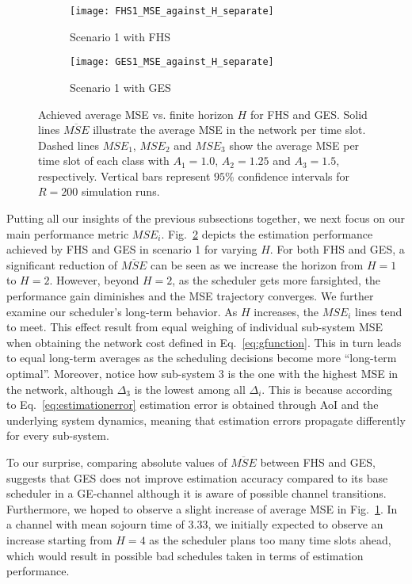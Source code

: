 \begin{figure}[htb]
  \centering
  \begin{subfigure}{0.49\textwidth}
    \centering
    \texttt{[image: FHS1\_MSE\_against\_H\_separate]}
    \caption{Scenario 1 with FHS}
    \label{fig:surprise}
  \end{subfigure}
  \hfill
  \begin{subfigure}{0.5\textwidth}
    \centering
    \texttt{[image: GES1\_MSE\_against\_H\_separate]}
    \caption{Scenario 1 with GES}
  \end{subfigure}
  \caption[Scenario 1: Average MSE vs. finite horizon $H$]{Achieved average
  MSE vs. finite horizon $H$ for FHS and GES. Solid lines $\overline{MSE}$
  illustrate the average MSE in the network per time slot. Dashed lines
  $MSE_1$, $MSE_2$ and $MSE_3$ show the average MSE per time slot of each
  class with $A_1=1.0$, $A_2=1.25$ and $A_3=1.5$, respectively. Vertical bars
  represent $95\%$ confidence intervals for $R=200$ simulation runs.}
  \label{fig:MSEavg}
\end{figure}

Putting all our insights of the previous subsections together, we next focus on
our main performance metric $MSE_i$. Fig.~\ref{fig:MSEavg} depicts the
estimation performance achieved by FHS and GES in scenario 1 for varying $H$.
For both FHS and GES, a significant reduction of $\overline{MSE}$ can be seen as
we increase the horizon from $H=1$ to $H=2$. However, beyond $H=2$, as the
scheduler gets more farsighted, the performance gain diminishes and the MSE
trajectory converges. We further examine our scheduler's long-term behavior. As
$H$ increases, the $MSE_i$ lines tend to meet. This effect result from equal
weighing of individual sub-system MSE when obtaining the network cost defined in
Eq.~\eqref{eq:gfunction}. This in turn leads to equal long-term averages as the
scheduling decisions become more ``long-term optimal''. Moreover, notice how
sub-system 3 is the one with the highest MSE in the network, although $\Delta_3$
is the lowest among all $\Delta_i$. This is because according to
Eq.~\eqref{eq:estimationerror} estimation error is obtained through AoI and the
underlying system dynamics, meaning that estimation errors propagate differently
for every sub-system.

To our surprise, comparing absolute values of $\overline{MSE}$ between FHS and
GES, suggests that GES does not improve estimation accuracy compared to its base
scheduler in a GE-channel although it is aware of possible channel transitions.
Furthermore, we hoped to observe a slight increase of average MSE in
Fig.~\ref{fig:surprise}. In a channel with mean sojourn time of 3.33, we
initially expected to observe an increase starting from $H=4$ as the scheduler
plans too many time slots ahead, which would result in possible bad schedules
taken in terms of estimation performance.

